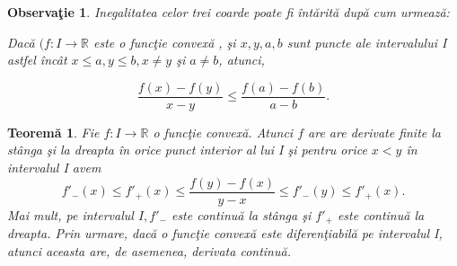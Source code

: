 \documentclass[a4paper,12pt,oneside]{report}
\newtheorem{theorem}{Teorem\u a}
\newtheorem{remark}{Observa\c{t}ie}
\begin{document}
\begin{remark}
Inegalitatea celor trei coarde poate fi \^{i}nt\u{a}rit\u{a} dup\u{a} cum urmeaz\u{a}:

Dac\u{a} \((f : I \rightarrow \mathbb{R}\) este o func\c{t}ie convex\u{a} , \c{s}i \(x,y,a,b\) sunt puncte ale intervalului I astfel \^{i}nc\^{a}t \(x \leq a, y\leq b, x \neq y\) \c{s}i \(a \neq b\), atunci,
\end{remark}
\begin{displaymath}
   \frac{f\left ( x \right )- f\left ( y \right )}{x-y}\leq \frac{f\left ( a \right )- f\left ( b \right )}{a-b}.
\end{displaymath}
\begin{theorem}
Fie \(f : I \rightarrow \mathbb{R}\) o func\c{t}ie convex\u{a}. Atunci \(f\) are are derivate finite la st\^{a}nga \c{s}i la dreapta \^{i}n orice punct interior al lui I \c{s}i pentru orice \(x <y\) \^{i}n intervalul I avem
\begin{displaymath}
   {f}'_{-}\left ( x \right )\leq {f}'_{+}\left ( x \right )\leq \frac{f\left ( y \right )-f\left ( x \right )}{y-x}\leq {f}'_{-}\left ( y \right )\leq {f}'_{+}\left ( x \right ).
\end{displaymath}
Mai mult, pe intervalul \(I, {f}'_{-}\) este continu\u{a} la st\^{a}nga \c{s}i \({f}'_{+}\) este continu\u{a} la dreapta.
  Prin urmare, dac\u{a} o func\c{t}ie convex\u{a} este diferen\c{t}iabil\u{a} pe intervalul I, atunci aceasta are, de asemenea, derivata continu\u{a}.
\end{theorem}
\end{document}

